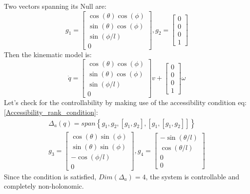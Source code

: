 Two vectors spanning its Null are:
\begin{equation*}
    g_1=
    \begin{bmatrix}
        \cos(\theta)\cos(\phi)\\
        \sin(\theta)\cos(\phi)\\
        \sin(\phi/l)\\
        0
    \end{bmatrix}, 
    g_2 =
    \begin{bmatrix}
        0 \\ 0 \\ 0 \\ 1
    \end{bmatrix}
\end{equation*}
Then the kinematic model is:
\begin{equation*}
    \dot{q} =
    \begin{bmatrix}
        \cos(\theta)\cos(\phi)\\
        \sin(\theta)\cos(\phi)\\
        \sin(\phi/l)\\
        0
    \end{bmatrix}
    v+
    \begin{bmatrix}
        0 \\ 0 \\ 0 \\ 1
    \end{bmatrix}
    \omega
\end{equation*}
Let's check for the controllability by making use of the accessibility condition eq: \ref{Accessibility_rank_condition}:
\begin{gather*}
    \Delta_{a}(q)=span\left\{g_1,g_2,[g_1,g_2],[g_1,[g_1,g_2]]\right\} \\
    g_3=
    \begin{bmatrix}
        \cos(\theta)\sin(\phi)\\
        \sin(\theta)\sin(\phi)\\
        -\cos(\phi/l) \\
        0
    \end{bmatrix}, 
    g_4=
    \begin{bmatrix}
        -\sin(\theta/l)\\
        \cos(\theta/l) \\
        0\\
        0
    \end{bmatrix}
\end{gather*}
Since the condition is satisfied, $Dim(\Delta_a)=4$, the system is controllable and completely non-holonomic.
